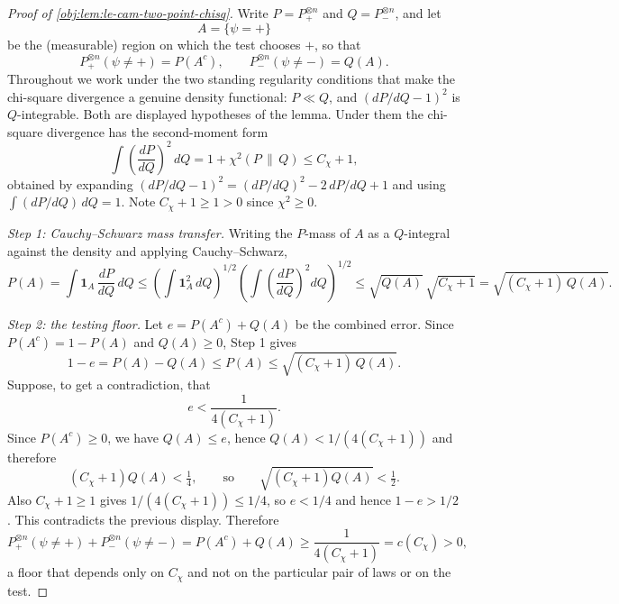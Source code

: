 \documentclass[11pt]{article}
\begin{document}
\begin{proof}[Proof of \cref{obj:lem:le-cam-two-point-chisq}]
Write \(P=P_+^{\otimes n}\) and \(Q=P_-^{\otimes n}\), and let
\[
A=\{\psi=+\}
\]
be the (measurable) region on which the test chooses \(+\), so that
\[
P_+^{\otimes n}(\psi\ne +)=P(A^c),
\qquad
P_-^{\otimes n}(\psi\ne -)=Q(A).
\]
Throughout we work under the two standing regularity conditions that make the chi-square divergence a genuine density functional: \(P\ll Q\), and \((dP/dQ-1)^2\) is \(Q\)-integrable.  Both are displayed hypotheses of the lemma.  Under them the chi-square divergence has the second-moment form
\[
\int \left(\frac{dP}{dQ}\right)^2\,dQ
=1+\chi^2(P\,\|\,Q)\le C_\chi+1,
\]
obtained by expanding \((dP/dQ-1)^2=(dP/dQ)^2-2\,dP/dQ+1\) and using \(\int (dP/dQ)\,dQ=1\).  Note \(C_\chi+1\ge1>0\) since \(\chi^2\ge0\). %

\emph{Step 1: Cauchy--Schwarz mass transfer.}  Writing the \(P\)-mass of \(A\) as a \(Q\)-integral against the density and applying Cauchy--Schwarz,
\[
P(A)
=\int \mathbf 1_A\,\frac{dP}{dQ}\,dQ
\le
\left(\int \mathbf 1_A^2\,dQ\right)^{1/2}
\left(\int \left(\frac{dP}{dQ}\right)^2dQ\right)^{1/2}
\le
\sqrt{Q(A)}\,\sqrt{C_\chi+1}
=
\sqrt{(C_\chi+1)\,Q(A)} .
\]

\emph{Step 2: the testing floor.}  Let \(e=P(A^c)+Q(A)\) be the combined error.  Since \(P(A^c)=1-P(A)\) and \(Q(A)\ge0\), Step 1 gives
\[
1-e=P(A)-Q(A)\le P(A)\le \sqrt{(C_\chi+1)\,Q(A)} .
\]
Suppose, to get a contradiction, that
\[
e<\frac{1}{4(C_\chi+1)} .
\]
Since \(P(A^c)\ge0\), we have \(Q(A)\le e\), hence \(Q(A)<1/(4(C_\chi+1))\) and therefore
\[
(C_\chi+1)Q(A)<\tfrac14,
\qquad\text{so}\qquad
\sqrt{(C_\chi+1)Q(A)}<\tfrac12 .
\]
Also \(C_\chi+1\ge1\) gives \(1/(4(C_\chi+1))\le1/4\), so \(e<1/4\) and hence \(1-e>1/2\).  This contradicts the previous display.  Therefore
\[
P_+^{\otimes n}(\psi\ne +)+P_-^{\otimes n}(\psi\ne -)
 =P(A^c)+Q(A)
 \ge \frac{1}{4(C_\chi+1)}
 =c(C_\chi)>0,
\]
a floor that depends only on \(C_\chi\) and not on the particular pair of laws or on the test. %


\end{proof}
\end{document}
